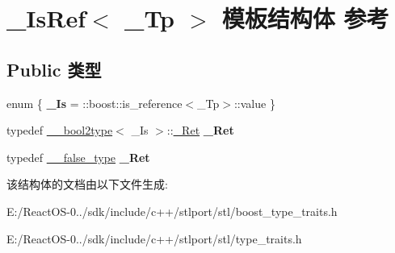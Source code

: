 \hypertarget{struct___is_ref}{}\section{\+\_\+\+Is\+Ref$<$ \+\_\+\+Tp $>$ 模板结构体 参考}
\label{struct___is_ref}
\subsection*{Public 类型}
\begin{DoxyCompactItemize}
\item 
\mbox{\label{struct___is_ref_a32b857312928495bb7e31a6641aeca04}} 
enum \{ {\bfseries \+\_\+\+Is} = \+:\+:boost\+:\+:is\+\_\+reference$<$\+\_\+\+Tp$>$\+:\+:value
 \}
\item 
\mbox{\label{struct___is_ref_a653177519b5500e398bc2e6087cc2aa0}} 
typedef \hyperlink{struct____bool2type}{\+\_\+\+\_\+bool2type}$<$ \+\_\+\+Is $>$\+::\hyperlink{struct____true__type}{\+\_\+\+Ret} {\bfseries \+\_\+\+Ret}
\item 
\mbox{\label{struct___is_ref_a5aae3d7208b7b2d83a6d8785378fdc19}} 
typedef \hyperlink{struct____false__type}{\+\_\+\+\_\+false\+\_\+type} {\bfseries \+\_\+\+Ret}
\end{DoxyCompactItemize}


该结构体的文档由以下文件生成\+:\begin{DoxyCompactItemize}
\item 
E\+:/\+React\+O\+S-\/0../sdk/include/c++/stlport/stl/boost\+\_\+type\+\_\+traits.\+h\item 
E\+:/\+React\+O\+S-\/0../sdk/include/c++/stlport/stl/type\+\_\+traits.\+h\end{DoxyCompactItemize}
